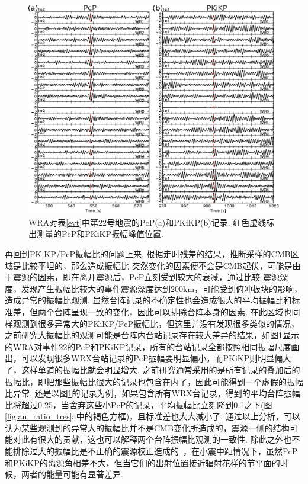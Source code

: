 \begin{figure}[ht]
\centering
\includegraphics[width=\linewidth]{fig/chap3/pcp_pkikp}
\caption{WRA对表\ref{evt}中第22号地震的PcP(a)和PKiKP(b)记录. 红色虚线标出测量的PcP和PKiKP振幅峰值位置. }
\label{fig:pcp_pkikp}
\end{figure}

再回到PKiKP/PcP振幅比的问题上来. 根据走时残差的结果，推断采样的CMB区域是比较平坦的，那么造成振幅比
突然变化的因素便不会是CMB起伏，可能是由于震源的因素，即在离开震源后，PcP立刻受到较大的衰减，通过比较
震源深度，发现产生振幅比较大的事件震源深度达到200km，可能受到俯冲板块的影响，造成异常的振幅比观测. 虽然台阵记录的不确定性也会造成很大的平均振幅比和标准差，但两个台阵呈现一致的变化，因此可以排除台阵本身的因素. \citet{Koper2004a}在此区域也同样观测到很多异常大的PKiKP/PcP振幅比，但这里并没有发现很多类似的情况，之前研究大振幅比的观测可能是台阵内台站记录存在较大差异的结果，如图\ref{fig:pcp_pkikp}显示的WRA对事件22的PcP和PKiKP记录，所有的台站记录全都按照相同振幅尺度画出，可以发现很多WRX台站记录的PcP振幅要明显偏小，而PKiKP则明显偏大了，这样单道的振幅比就会明显增大. 之前研究通常采用的是所有记录的叠加后的振幅比，即把那些振幅比很大的记录也包含在内了，因此可能得到一个虚假的振幅比异常. 还是以图\ref{fig:pcp_pkikp}的记录为例，如果包含所有WRX台记录，得到的平均台阵振幅比将超过0.25，当舍弃这些小PcP的记录，平均振幅比立刻降到0.1之下(图\ref{fig:au_ratio_tres}a中的褐色方框)，且标准差也大大减小了. 通过以上分析，可以认为某些观测到的异常大的振幅比并不是CMB变化所造成的，震源一侧的结构可能对此有很大的贡献，这也可以解释两个台阵振幅比观测的一致性. 除此之外也不能排除过大的振幅比是不正确的震源校正造成的~\citep{Rost2004a}，在小震中距情况下，虽然PcP和PKiKP的离源角相差不大，但当它们的出射位置接近辐射花样的节平面的时候，两者的能量可能有显著差异.


